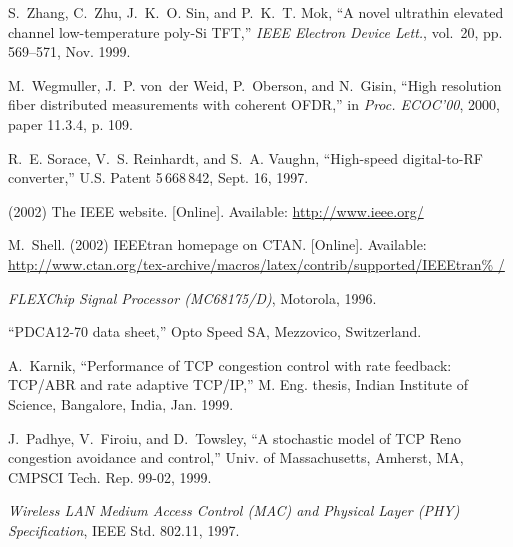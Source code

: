 \documentclass[conference]{csce}
\begin{document}
\begin{thebibliography}{1}
S.~Zhang, C.~Zhu, J.~K.~O. Sin, and P.~K.~T. Mok, ``A novel ultrathin elevated
  channel low-temperature poly-{Si} {TFT},'' \emph{{IEEE} Electron Device
  Lett.}, vol.~20, pp. 569--571, Nov. 1999.

M.~Wegmuller, J.~P. von~der Weid, P.~Oberson, and N.~Gisin, ``High resolution
  fiber distributed measurements with coherent {OFDR},'' in \emph{Proc.
  {ECOC}'00}, 2000, paper 11.3.4, p. 109.

R.~E. Sorace, V.~S. Reinhardt, and S.~A. Vaughn, ``High-speed digital-to-{RF}
  converter,'' U.S. Patent 5\,668\,842, Sept. 16, 1997.

\BIBentryALTinterwordspacing
(2002) The {IEEE} website. [Online]. Available: \url{http://www.ieee.org/}
\BIBentrySTDinterwordspacing

\BIBentryALTinterwordspacing
M.~Shell. (2002) {IEEE}tran homepage on {CTAN}. [Online]. Available:
  \url{http://www.ctan.org/tex-archive/macros/latex/contrib/supported/IEEEtran%
/}
\BIBentrySTDinterwordspacing

\emph{{FLEXChip} Signal Processor ({MC68175/D})}, Motorola, 1996.

``{PDCA12-70} data sheet,'' Opto Speed SA, Mezzovico, Switzerland.

A.~Karnik, ``Performance of {TCP} congestion control with rate feedback:
  {TCP/ABR} and rate adaptive {TCP/IP},'' M. Eng. thesis, Indian Institute of
  Science, Bangalore, India, Jan. 1999.

J.~Padhye, V.~Firoiu, and D.~Towsley, ``A stochastic model of {TCP} {R}eno
  congestion avoidance and control,'' Univ. of Massachusetts, Amherst, MA,
  CMPSCI Tech. Rep. 99-02, 1999.

\emph{Wireless {LAN} Medium Access Control {(MAC)} and Physical Layer {(PHY)}
  Specification}, IEEE Std. 802.11, 1997.

\end{thebibliography}
\end{document}
